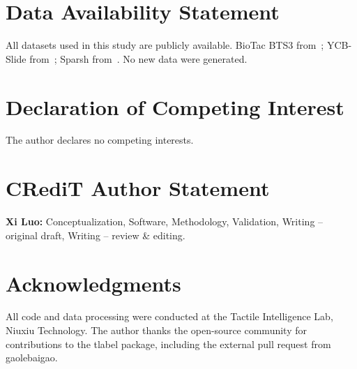 \documentclass[preprint,12pt,a4paper]{elsarticle}
\begin{document}
\section*{Data Availability Statement}
All datasets used in this study are publicly available. BioTac BTS3 from~\cite{zapata2018biotac}; YCB-Slide from~\cite{suresh2022midastouch}; Sparsh from~\cite{kerr2024sparsh}. No new data were generated.

\section*{Declaration of Competing Interest}
The author declares no competing interests.

\section*{CRediT Author Statement}
\textbf{Xi Luo:} Conceptualization, Software, Methodology, Validation, Writing -- original draft, Writing -- review \& editing.

\section*{Acknowledgments}
All code and data processing were conducted at the Tactile Intelligence Lab, Niuxiu Technology. The author thanks the open-source community for contributions to the tlabel package, including the external pull request from gaolebaigao.



\end{document}
